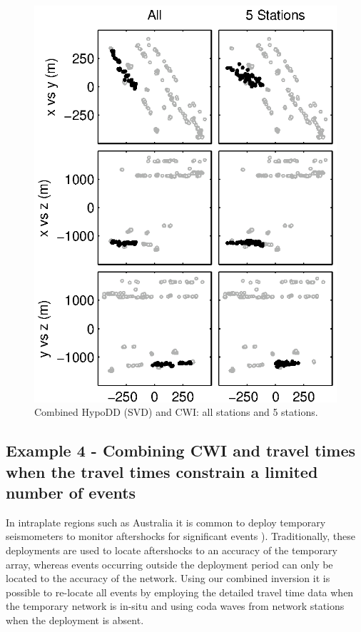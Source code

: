 \documentclass[extra]{gji}
\begin{document}
\begin{figure}
\includegraphics{diags/CalaverasLoc5_hypoDD_SVD.eps}
\caption{Combined HypoDD (SVD) and CWI: all stations and 5
stations.} \label{fig-68Calaverasevents_ttandcoda1}
\end{figure}




\subsection{Example 4 - Combining CWI and travel times when the travel times constrain a limited number of events}


In intraplate regions such as Australia it is common to deploy
temporary seismometers to monitor aftershocks for significant events
\citep{dr_Bowman90a, dr_Leonard02a}). Traditionally, these
deployments are used to locate aftershocks to an accuracy of the
temporary array, whereas events occurring outside the deployment
period can only be located to the accuracy of the network. Using our
combined inversion it is possible to re-locate all events by
employing the detailed travel time data when the temporary network
is in-situ and using coda waves from network stations when the
deployment is absent.
\end{document}

